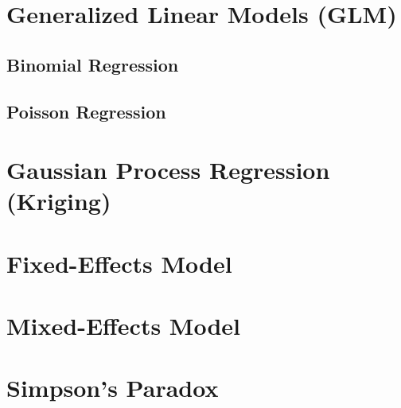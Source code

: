 \section{Generalized Linear Models (GLM)}
\label{regression:GLM}

\subsection{Binomial Regression}
\label{regression:GLM:binomial}

\subsection{Poisson Regression}
\label{regression:GLM:poisson}

\section{Gaussian Process Regression (Kriging)}
\label{regression:kriging}


\section{Fixed-Effects Model}
\label{regression:fixed_effects}

\section{Mixed-Effects Model}
\label{regression:mixed_effects}

\section{Simpson's Paradox}
\label{regression:simpsons_paradox}
